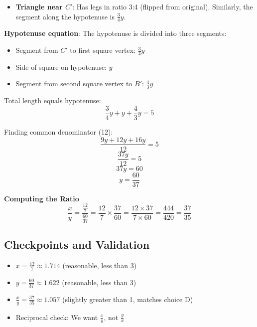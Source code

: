\documentclass[]{article}
\begin{document}
\begin{solutionbox}
\begin{itemize}
    \item \textbf{Triangle near $C'$}: Has legs in ratio 3:4 (flipped from original). Similarly, the segment along the hypotenuse is $\frac{3}{4}y$.
\end{itemize}

\textbf{Hypotenuse equation}: The hypotenuse is divided into three segments:
\begin{itemize}
    \item Segment from $C'$ to first square vertex: $\frac{3}{4}y$
    \item Side of square on hypotenuse: $y$
    \item Segment from second square vertex to $B'$: $\frac{4}{3}y$
\end{itemize}

Total length equals hypotenuse:
\[\frac{3}{4}y + y + \frac{4}{3}y = 5\]

Finding common denominator (12):
\[\frac{9y + 12y + 16y}{12} = 5\]
\[\frac{37y}{12} = 5\]
\[37y = 60\]
\[y = \frac{60}{37}\]

\textbf{Computing the Ratio}
\[\frac{x}{y} = \frac{\frac{12}{7}}{\frac{60}{37}} = \frac{12}{7} \times \frac{37}{60} = \frac{12 \times 37}{7 \times 60} = \frac{444}{420} = \frac{37}{35}\]

\subsection*{Checkpoints and Validation}
\begin{itemize}[leftmargin=*]
    \item $x = \frac{12}{7} \approx 1.714$ \checkmark (reasonable, less than 3)
    \item $y = \frac{60}{37} \approx 1.622$ \checkmark (reasonable, less than 3)
    \item $\frac{x}{y} = \frac{37}{35} \approx 1.057$ \checkmark (slightly greater than 1, matches choice D)
    \item Reciprocal check: We want $\frac{x}{y}$, not $\frac{y}{x}$ \checkmark
\end{itemize}


\end{solutionbox}
\end{document}
